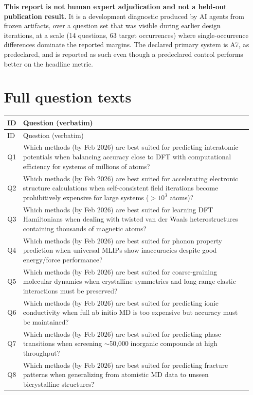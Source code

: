 \documentclass[11pt,a4paper]{article}
\begin{document}
\textbf{This report is not human expert adjudication and not a held-out publication result.} It is a
development diagnostic produced by AI agents from frozen artifacts, over a question set that was visible
during earlier design iterations, at a scale (14 questions, 63 target occurrences) where single-occurrence
differences dominate the reported margins. The declared primary system is A7, as predeclared, and is
reported as such even though a predeclared control performs better on the headline metric.

\appendix
\section{Full question texts}

\begin{longtable}{p{0.8cm}p{14.2cm}}
\toprule
ID & Question (verbatim) \\
\midrule
\endfirsthead
\toprule
ID & Question (verbatim) \\
\midrule
\endhead
\bottomrule
\endfoot
Q1 & Which methods (by Feb 2026) are best suited for predicting interatomic potentials when balancing accuracy close to DFT with computational efficiency for systems of millions of atoms? \\
Q2 & Which methods (by Feb 2026) are best suited for accelerating electronic structure calculations when self-consistent field iterations become prohibitively expensive for large systems ($>10^{3}$ atoms)? \\
Q3 & Which methods (by Feb 2026) are best suited for learning DFT Hamiltonians when dealing with twisted van der Waals heterostructures containing thousands of magnetic atoms? \\
Q4 & Which methods (by Feb 2026) are best suited for phonon property prediction when universal MLIPs show inaccuracies despite good energy/force performance? \\
Q5 & Which methods (by Feb 2026) are best suited for coarse-graining molecular dynamics when crystalline symmetries and long-range elastic interactions must be preserved? \\
Q6 & Which methods (by Feb 2026) are best suited for predicting ionic conductivity when full ab initio MD is too expensive but accuracy must be maintained? \\
Q7 & Which methods (by Feb 2026) are best suited for predicting phase transitions when screening $\sim$50,000 inorganic compounds at high throughput? \\
Q8 & Which methods (by Feb 2026) are best suited for predicting fracture patterns when generalizing from atomistic MD data to unseen bicrystalline structures? \\

\end{longtable}
\end{document}
